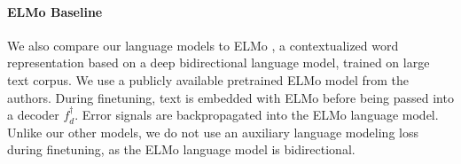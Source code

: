 \documentclass[letterpaper]{article} %
\begin{document}
\begin{table}[!t]
\caption{Hyperparameters for language modeling and finetuning phases.}
\label{table:hparams}
\end{table}


\paragraph{ELMo Baseline}
We also compare our language models to ELMo \protect\cite{ELMo}, a contextualized word representation based on a deep bidirectional language model, trained on large text corpus. We use a publicly available pretrained ELMo model from the authors. During finetuning, text is embedded with ELMo before being passed into a decoder $f_d^{\dagger}$. Error signals are backpropagated into the ELMo language model. Unlike our other models, we do not use an auxiliary language modeling loss during finetuning, as the ELMo language model is bidirectional.
\end{document}
